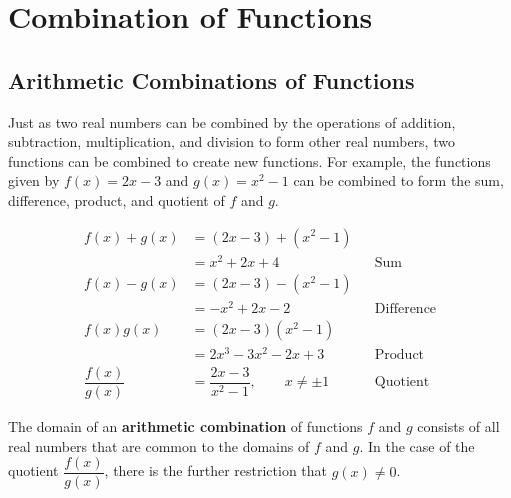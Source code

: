 \chapter{Combination of Functions}
\section{Arithmetic Combinations of Functions}
Just as two real numbers can be combined by the operations of addition, subtraction, multiplication, and division to form other real numbers, two functions can be combined to create new functions. For example, the functions given by $f(x)=2x-3$ and $g(x)=x^2-1$ can be combined to form the sum, difference, product, and quotient of $f$ and $g$. \cite{ci}

\begin{align*}
    f(x)+g(x)   &=  (2x-3)+(x^2-1)\\
                &=  x^2+2x+4        &&\text{Sum}\\
    f(x)-g(x)   &=  (2x-3)-(x^2-1)\\
                &=  -x^2+2x-2       &&\text{Difference}\\
    f(x)g(x)    &=  (2x-3)(x^2-1)\\
                &=  2x^3-3x^2-2x+3  &&\text{Product}\\
    \dfrac{f(x)}{g(x)}   &=  \dfrac{2x-3}{x^2-1}, \qquad x\neq \pm 1      &&\text{Quotient}
\end{align*}

The domain of an \textbf{arithmetic combination} of functions $f$ and $g$ consists of all real numbers that are common to the domains of $f$ and $g$. In the case of the quotient $\dfrac{f(x)}{g(x)}$, there is the further restriction that $g(x)\neq 0$. \cite{ci}

